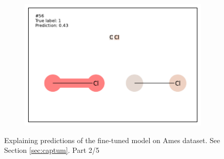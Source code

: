 \begin{figure}
\begin{subfigure}[b]{0.33\textwidth}
\end{subfigure}\begin{subfigure}[b]{0.33\textwidth} 
  \centering 
  \includegraphics[width=\textwidth]{figures/ames/ames56.pdf} 
\end{subfigure} 
\caption{Explaining predictions of the fine-tuned model on Ames dataset. See Section \ref{sec:captum}. Part 2/5}
\label{fig:captum-ames-2}
\end{figure}

